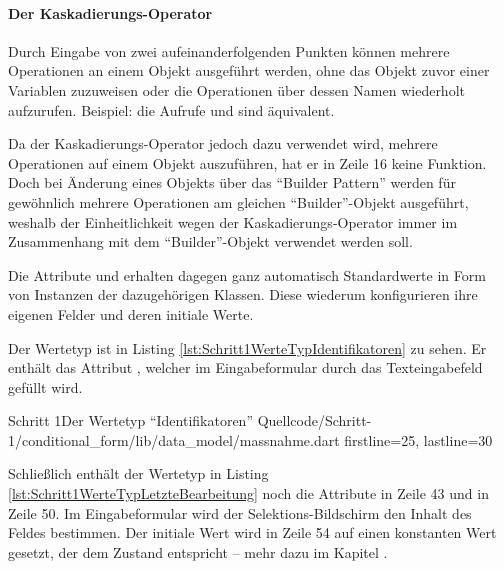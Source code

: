 \paragraph{Der Kaskadierungs-Operator}

Durch Eingabe von zwei aufeinanderfolgenden Punkten  können mehrere Operationen an einem Objekt ausgeführt werden,
ohne das Objekt zuvor einer Variablen zuzuweisen oder die Operationen über dessen Namen wiederholt aufzurufen. Beispiel: die Aufrufe   und  sind äquivalent.

Da der Kaskadierungs-Operator jedoch dazu verwendet wird, mehrere Operationen auf einem Objekt auszuführen, hat er in Zeile 16 keine Funktion.
Doch bei Änderung eines Objekts über das \enquote{Builder Pattern} werden für gewöhnlich mehrere Operationen am gleichen \enquote{Builder}-Objekt ausgeführt, weshalb der Einheitlichkeit wegen der Kaskadierungs-Operator immer im Zusammenhang mit dem \enquote{Builder}-Objekt verwendet werden soll.

Die Attribute  und   erhalten dagegen ganz automatisch Standardwerte in Form von Instanzen der dazugehörigen Klassen.
Diese wiederum konfigurieren ihre eigenen Felder und deren initiale Werte.



Der Wertetyp  ist in Listing \ref{lst:Schritt1WerteTypIdentifikatoren} zu sehen.
Er enthält das Attribut , welcher im Eingabeformular durch das Texteingabefeld gefüllt wird.

\begin{alexlisting}{Schritt 1}{Der Wertetyp \enquote{Identifikatoren}}
  {Quellcode/Schritt-1/conditional_form/lib/data_model/massnahme.dart}
  {firstline=25, lastline=30}
  \label{lst:Schritt1WerteTypIdentifikatoren}
\end{alexlisting}

Schließlich enthält der Wertetyp  in Listing \ref{lst:Schritt1WerteTypLetzteBearbeitung} noch die Attribute  in Zeile 43 und  in Zeile 50.
Im Eingabeformular wird der Selektions-Bildschirm den Inhalt des Feldes  bestimmen.
Der initiale Wert wird in Zeile 54 auf einen konstanten Wert gesetzt, der dem Zustand  entspricht -- mehr dazu im Kapitel .

